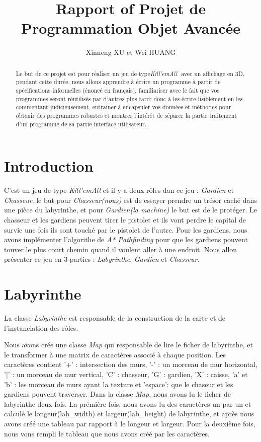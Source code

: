\documentclass{article}
\title{Rapport of Projet de Programmation Objet Avancée}
\author{Xinneng XU et Wei HUANG}
\begin{document}
\maketitle

\begin{abstract}
Le but de ce projet est pour réaliser un jeu de type ​\textsl{Kill'emAll}  ​ avec un affichage en 3D, pendant cette durée, nous allons apprendre à écrire un programme à partir de spécifications informelles (énoncé en français), familiariser avec le fait que vos programmes seront réutilisés par d'autres plus tard; donc à les écrire lisiblement en les commentant judicieusement, entrainer à encapsuler vos données et méthodes pour obtenir des programmes robustes et  montrer l'intérêt de séparer la partie traitement d'un programme de sa partie interface utilisateur.
\end{abstract}


\section{Introduction}
C'est un jeu de type ​\textsl{Kill'emAll} et il y a deux rôles dan ce jeu : \textsl{Gardien} et \textsl{Chasseur}.  le but pour \textsl{Chasseur(nous)} est de essayer prendre un trésor caché dans une pièce du labyrinthe, et pour \textsl{Gardien(la machine)} le but est de le protéger. Le chasseur et les gardiens peuvent tirer le pistolet et ils vont perdre le capital de survie une fois ils sont touché par le pistolet de l'autre. Pour les gardiens, nous avons implémenter l'algorithe de \textsl{A* Pathfinding} pour que les gardiens pouvent touver le plus court chemin quand il voulent aller à une endroit. Nous allon présenter ce jeu en 3 parties : \textsl{Labyrinthe}, \textsl{Gardien} et \textsl{Chasseur}.

\section{Labyrinthe}
La classe \textsl{Labyrinthe} est responsable de la construction de la carte et de l'instanciation des rôles. 

Nous avons crée une classe \textsl{Map} qui responsable de lire le ficher de labyrinthe, et le transformer à une matrix de caractères associé à chaque position. Les caractères contient  '+' : intersection des murs,  '-' :  un morceau de mur horizontal, '|' :   un morceau de mur vertical,  'C' : chasseur,  'G' : gardien,   'X' :  caisse, 'a' et 'b' : les morceau de murs ayant la texture et 'espace': que le chaseur et les gardiens pouvent traverser. Dans la classe \textsl{Map}, nous avons lu le ficher de labyrinthe deux fois. La prémière fois, nous avons lu des caractères un par un et calculé le longeur(lab\_width) et largeur(lab\_height) de labyrinthe, et après nous avons créé une tableau par rapport à le longeur et largeur. Pour la deuxième fois, nous vons rempli le tableau   que nous avons créé par les caractères.
\end{document}
